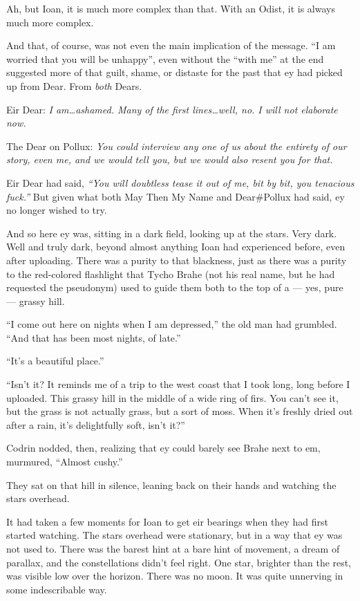 Ah, but Ioan, it is much more complex than that. With an Odist, it is always much more complex.

And that, of course, was not even the main implication of the message. ``I am worried that you will be unhappy'', even without the ``with me'' at the end suggested more of that guilt, shame, or distaste for the past that ey had picked up from Dear. From \emph{both} Dears.

Eir Dear: \emph{I am\ldots ashamed. Many of the first lines\ldots well, no. I will not elaborate now.}

The Dear on Pollux: \emph{You could interview any one of us about the entirety of our story, even me, and we would tell you, but we would also resent you for that.}

Eir Dear had said, \emph{``You will doubtless tease it out of me, bit by bit, you tenacious fuck.''} But given what both May Then My Name and Dear\#Pollux had said, ey no longer wished to try.

And so here ey was, sitting in a dark field, looking up at the stars. Very dark. Well and truly dark, beyond almost anything Ioan had experienced before, even after uploading. There was a purity to that blackness, just as there was a purity to the red-colored flashlight that Tycho Brahe (not his real name, but he had requested the pseudonym) used to guide them both to the top of a — yes, pure — grassy hill.

``I come out here on nights when I am depressed,'' the old man had grumbled. ``And that has been most nights, of late.''

``It's a beautiful place.''

``Isn't it? It reminds me of a trip to the west coast that I took long, long before I uploaded. This grassy hill in the middle of a wide ring of firs. You can't see it, but the grass is not actually grass, but a sort of moss. When it's freshly dried out after a rain, it's delightfully soft, isn't it?''

Codrin nodded, then, realizing that ey could barely see Brahe next to em, murmured, ``Almost cushy.''

They sat on that hill in silence, leaning back on their hands and watching the stars overhead.

It had taken a few moments for Ioan to get eir bearings when they had first started watching. The stars overhead were stationary, but in a way that ey was not used to. There was the barest hint at a bare hint of movement, a dream of parallax, and the constellations didn't feel right. One star, brighter than the rest, was visible low over the horizon. There was no moon. It was quite unnerving in some indescribable way.

